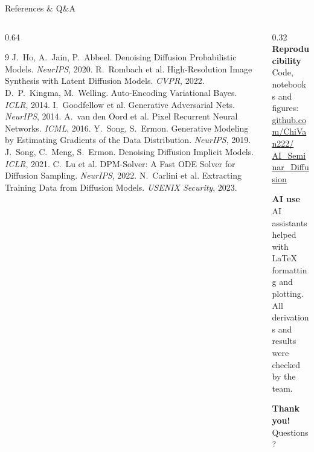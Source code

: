 \documentclass[11pt,aspectratio=169]{beamer}
\newcommand{\Head}[1]{\textcolor{Main}{\textbf{#1}}}
\begin{document}
\begin{frame}{References \& Q\&A}
  \begin{columns}[T,onlytextwidth]
    \begin{column}{0.64\textwidth}
      \scriptsize
      \begin{thebibliography}{9}\setlength{\itemsep}{0pt}
         J.\ Ho, A.\ Jain, P.\ Abbeel. Denoising Diffusion Probabilistic Models. \textit{NeurIPS}, 2020.
         R.\ Rombach et al. High-Resolution Image Synthesis with Latent Diffusion Models. \textit{CVPR}, 2022.
         D.\ P.\ Kingma, M.\ Welling. Auto-Encoding Variational Bayes. \textit{ICLR}, 2014.
         I.\ Goodfellow et al. Generative Adversarial Nets. \textit{NeurIPS}, 2014.
         A.\ van den Oord et al. Pixel Recurrent Neural Networks. \textit{ICML}, 2016.
         Y.\ Song, S.\ Ermon. Generative Modeling by Estimating Gradients of the Data Distribution. \textit{NeurIPS}, 2019.
         J.\ Song, C.\ Meng, S.\ Ermon. Denoising Diffusion Implicit Models. \textit{ICLR}, 2021.
         C.\ Lu et al. DPM-Solver: A Fast ODE Solver for Diffusion Sampling. \textit{NeurIPS}, 2022.
         N.\ Carlini et al. Extracting Training Data from Diffusion Models. \textit{USENIX Security}, 2023.
      \end{thebibliography}
    \end{column}
    \begin{column}{0.32\textwidth}
      \small
      \Head{Reproducibility}\\
      Code, notebooks and figures:\\
      {\footnotesize\href{https://github.com/ChiVan222/AI_Seminar_Diffusion}{github.com/ChiVan222/}\\
       \href{https://github.com/ChiVan222/AI_Seminar_Diffusion}{AI\_Seminar\_Diffusion}}

      \vspace{0.15cm}
      \Head{AI use}\\
      \footnotesize AI assistants helped with LaTeX formatting and plotting. All derivations and results were checked by the team.

      \vspace{0.1cm}
      \centering
      {\Large\color{Main}\textbf{Thank you!}}\\[2pt]
      \normalsize Questions?
    \end{column}
  \end{columns}
\end{frame}
\end{document}
